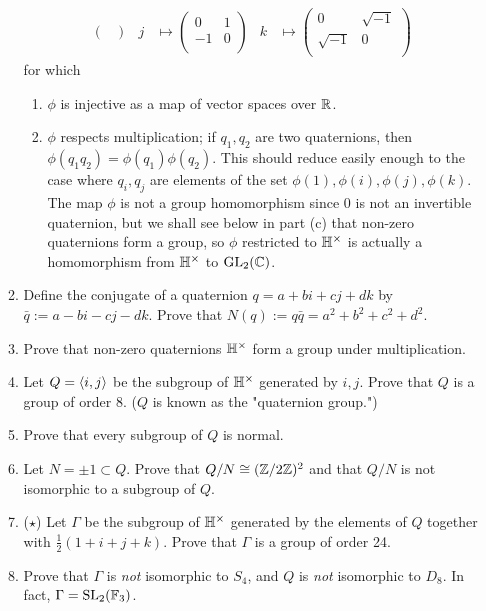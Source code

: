 \documentclass[../psets.tex]{subfiles}
\begin{document}
\begin{enumerate}
\begin{enumerate}
\begin{align*}
\begin{pmatrix}
            \end{pmatrix}&
            j &\mapsto
            \begin{pmatrix}
                0 & 1\\
                -1 & 0\\
            \end{pmatrix}&
            k &\mapsto
            \begin{pmatrix}
                0 & \sqrt{-1}\\
                \sqrt{-1} & 0\\
            \end{pmatrix}
        \end{align*}
        for which
        \begin{enumerate}
            \item $\phi$ is injective as a map of vector spaces over $\mathbb{R}$.
            \item $\phi$ respects multiplication; if $q_1,q_2$ are two quaternions, then $\phi(q_1q_2)=\phi(q_1)\phi(q_2)$. This should reduce easily enough to the case where $q_i,q_j$ are elements of the set $\phi(1),\phi(i),\phi(j),\phi(k)$. The map $\phi$ is not a group homomorphism since 0 is not an invertible quaternion, but we shall see below in part (c) that non-zero quaternions form a group, so $\phi$ restricted to $\mathbb{H}^\times$ is actually a homomorphism from $\mathbb{H}^\times$ to $\text{GL}_2(\mathbb{C})$.
        \end{enumerate}
        \item Define the conjugate of a quaternion $q=a+bi+cj+dk$ by $\bar{q}:=a-bi-cj-dk$. Prove that $N(q):=q\bar{q}=a^2+b^2+c^2+d^2$.
        \item Prove that non-zero quaternions $\mathbb{H}^\times$ form a group under multiplication.
        \item Let $Q=\left\langle{i,j}\right\rangle$ be the subgroup of $\mathbb{H}^\times$ generated by $i,j$. Prove that $Q$ is a group of order 8. ($Q$ is known as the "quaternion group.")
        \item Prove that every subgroup of $Q$ is normal.
        \item Let $N=\pm 1\subset Q$. Prove that $Q/N\cong(\mathbb{Z}/2\mathbb{Z})^2$ and that $Q/N$ is not isomorphic to a subgroup of $Q$.
        \item ($\star$) Let $\Gamma$ be the subgroup of $\mathbb{H}^\times$ generated by the elements of $Q$ together with $\frac{1}{2}(1+i+j+k)$. Prove that $\Gamma$ is a group of order 24.
        \item Prove that $\Gamma$ is \emph{not} isomorphic to $S_4$, and $Q$ is \emph{not} isomorphic to $D_8$. In fact, $\Gamma=\text{SL}_2(\mathbb{F}_3)$.

\end{enumerate}
\end{enumerate}
\end{document}
